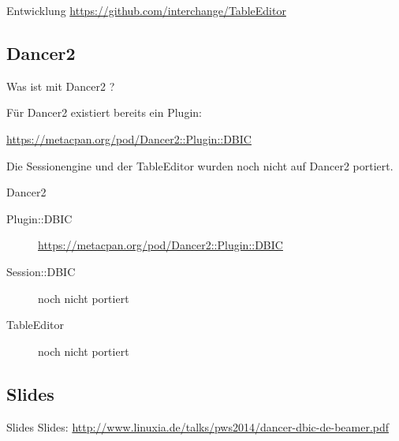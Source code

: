 \begin{frame}{Entwicklung}
\url{https://github.com/interchange/TableEditor}
\end{frame}

\subsection{Dancer2}

Was ist mit Dancer2 ?

Für Dancer2 existiert bereits ein Plugin:

\url{https://metacpan.org/pod/Dancer2::Plugin::DBIC}

Die Sessionengine und der TableEditor wurden noch nicht auf Dancer2 portiert.

\begin{frame}{Dancer2}
  \begin{description}
  \item[Plugin::DBIC] \url{https://metacpan.org/pod/Dancer2::Plugin::DBIC}
  \item[Session::DBIC] noch nicht portiert
  \item[TableEditor] noch nicht portiert
  \end{description}
\end{frame}


\subsection{Slides}

\begin{frame}{Slides}
Slides:
\url{http://www.linuxia.de/talks/pws2014/dancer-dbic-de-beamer.pdf}
\end{frame}



